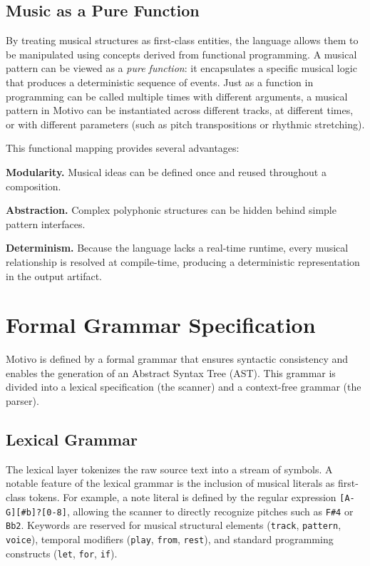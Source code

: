 \subsection{Music as a Pure Function}\label{detail-subsec:music-as-a-pure-function}

By treating musical structures as first-class entities, the language allows them to be manipulated using concepts
derived from functional programming.
A musical pattern can be viewed as a \textit{pure function}: it encapsulates a specific musical logic that produces a
deterministic sequence of events.
Just as a function in programming can be called multiple times with different arguments, a musical pattern in
Motivo can be instantiated across different tracks, at different times, or with different parameters (such as
pitch transpositions or rhythmic stretching).

This functional mapping provides several advantages:

\noindent \textbf{Modularity.} Musical ideas can be defined once and reused throughout a composition.

\noindent \textbf{Abstraction.} Complex polyphonic structures can be hidden behind simple pattern interfaces.

\noindent \textbf{Determinism.} Because the language lacks a real-time runtime, every musical relationship is
resolved at compile-time, producing a deterministic representation in the output artifact.


\section{Formal Grammar Specification}\label{detail-sec:formal-grammar}

Motivo is defined by a formal grammar that ensures syntactic consistency and enables the generation of an
Abstract Syntax Tree (AST).
This grammar is divided into a lexical specification (the scanner) and a context-free grammar (the parser).

\subsection{Lexical Grammar}\label{detail-subsec:lexical-grammar}

The lexical layer tokenizes the raw source text into a stream of symbols.
A notable feature of the lexical grammar is the inclusion of musical literals as first-class tokens.
For example, a note literal is defined by the regular expression \verb|[A-G][#b]?[0-8]|, allowing the scanner to
directly recognize pitches such as \texttt{F\#4} or \texttt{Bb2}.
Keywords are reserved for musical structural elements (\texttt{track}, \texttt{pattern}, \texttt{voice}), temporal
modifiers (\texttt{play}, \texttt{from}, \texttt{rest}), and standard programming constructs (\texttt{let},
\texttt{for}, \texttt{if}).

